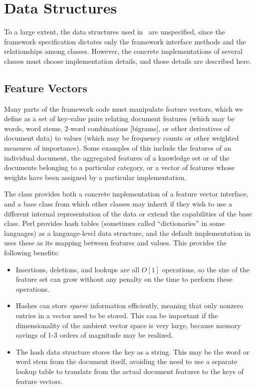 \section{Data Structures}

To a large extent, the data structures used in \aicat\ are
unspecified, since the framework specification dictates only the
framework interface methods and the relationships among classes.
However, the concrete implementations of several classes must choose
implementation details, and those details are described here.

\subsection{Feature Vectors}
\label{imp-featurevectors}

Many parts of the framework code must manipulate feature vectors,
which we define as a set of key-value pairs relating document features
(which may be words, word stems, 2-word combinations [bigrams], or
other derivatives of document data) to values (which may be frequency
counts or other weighted measures of importance).  Some examples of
this include the features of an individual document, the aggregated
features of a knowledge set or of the documents belonging to a
particular category, or a vector of features whose weights have been
assigned by a particular  implementation.

The  class provides both a concrete
implementation of a feature vector interface, and a base class from
which other classes may inherit if they wish to use a different
internal representation of the data or extend the capabilities of the
base class.  Perl provides hash tables (sometimes called
``dictionaries'' in some languages) as a language-level data
structure, and the default implementation in 
uses these as its mapping between features and values.  This provides
the following benefits:

\begin{itemize}
\item Insertions, deletions, and lookups are all $O[1]$
  operations, so the size of the feature set can grow without any
  penalty on the time to perform these operations.
\item Hashes can store \emph{sparse} information efficiently, meaning
  that only nonzero entries in a vector need to be stored.  This can
  be important if the dimensionality of the ambient vector space is
  very large, because memory savings of 1-3 orders of magnitude may be
  realized.
\item The hash data structure stores the key as a string.  This may be
  the word or word stem from the document itself, avoiding the need to
  use a separate lookup table to translate from the actual document
  features to the keys of feature vectors.
\end{itemize}

